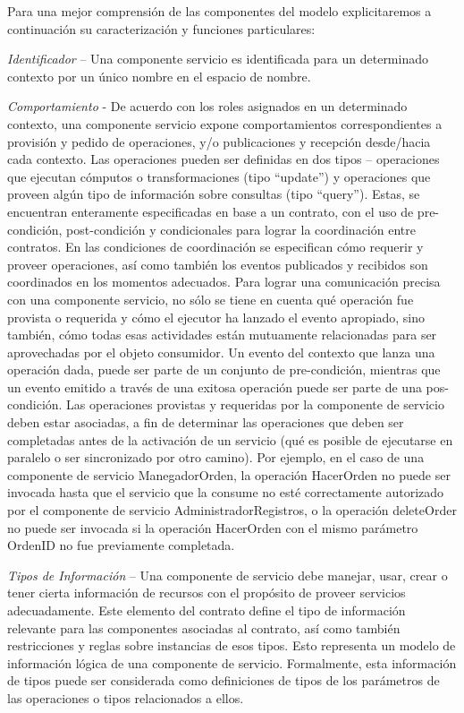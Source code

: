 \documentclass[12 pt,a4paper]{llncs}
\begin{document}
Para una mejor comprensión de las componentes del modelo explicitaremos a continuación su caracterización y funciones particulares: 

\textit{Identificador} – Una componente servicio es identificada para un determinado contexto por un único nombre en el espacio de nombre.

\textit{Comportamiento} -  De acuerdo con los roles asignados en un determinado contexto, una componente servicio expone comportamientos correspondientes a provisión y pedido de operaciones, y/o publicaciones y recepción  desde/hacia cada contexto. Las operaciones pueden ser definidas en dos tipos – operaciones que ejecutan cómputos o transformaciones (tipo “update”) y operaciones que proveen algún tipo de información sobre consultas  (tipo “query”). Estas, se encuentran enteramente especificadas en base a  un contrato, con el uso de pre-condición, post-condición y condicionales para lograr la coordinación entre contratos. En las condiciones de coordinación se especifican cómo requerir y proveer operaciones, así como también los eventos publicados  y recibidos son coordinados en los momentos adecuados. Para lograr una comunicación precisa con una componente servicio, no sólo se tiene en cuenta qué operación fue provista o requerida y cómo el ejecutor ha lanzado el evento apropiado, sino también, cómo todas esas actividades están mutuamente relacionadas para ser aprovechadas por el objeto consumidor. Un evento del contexto que lanza una operación dada, puede ser parte de un conjunto de pre-condición, mientras que un evento emitido a través de una exitosa operación puede ser parte de una pos-condición. 
Las operaciones provistas y requeridas por la componente de servicio deben estar asociadas, a fin de determinar las operaciones que deben ser completadas antes de la activación de un servicio (qué es posible de ejecutarse en paralelo o ser sincronizado por otro camino). Por ejemplo, en el caso de una componente de servicio ManegadorOrden, la operación HacerOrden no puede ser invocada hasta que el servicio que la consume no esté correctamente autorizado por el componente de servicio AdministradorRegistros, o la operación deleteOrder no puede ser invocada si la operación HacerOrden con el mismo parámetro OrdenID no fue previamente completada.

\textit{Tipos de Información} –  Una componente de servicio debe  manejar, usar,  crear o tener cierta información de recursos con el propósito de proveer servicios adecuadamente.  Este elemento del contrato define el tipo de información relevante para las componentes  asociadas al contrato, así como también restricciones y reglas sobre instancias de esos tipos. Esto representa un modelo de información lógica de una componente de servicio. Formalmente, esta información de tipos puede ser considerada como definiciones de tipos de  los parámetros de las operaciones o tipos relacionados a ellos.
\end{document}
